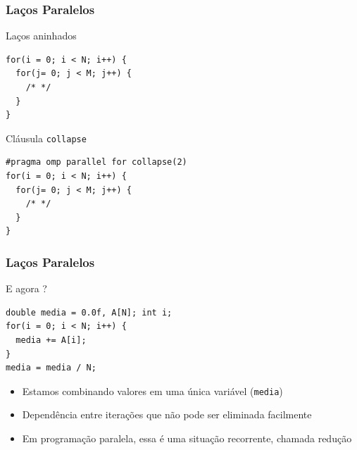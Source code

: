 \documentclass[xcolor={usenames,dvipsnames},12pt,presentation,aspectratio=169]{beamer}
\begin{document}
\begin{frame}[fragile]
  \frametitle{Laços Paralelos}
Laços aninhados
\begin{minipage}{0.95\textwidth}  
\begin{verbatim}
for(i = 0; i < N; i++) {
  for(j= 0; j < M; j++) {
    /* */
  }
}
\end{verbatim}
\end{minipage}
%
\pause
%
Cláusula \texttt{collapse}
\begin{minipage}{0.95\textwidth}  
\begin{verbatim}
#pragma omp parallel for collapse(2)
for(i = 0; i < N; i++) {
  for(j= 0; j < M; j++) {
    /* */
  }
}
\end{verbatim}
\end{minipage}
%
%
\end{frame}
\begin{frame}[fragile]
  \frametitle{Laços Paralelos}
E agora ?
\begin{minipage}{0.95\textwidth}  
\begin{verbatim}
double media = 0.0f, A[N]; int i;
for(i = 0; i < N; i++) {
  media += A[i];
}
media = media / N;
\end{verbatim}
\end{minipage}
%
\pause
%
\begin{itemize}
\item Estamos combinando valores em uma única variável (\texttt{media})
\item Dependência entre iterações que não pode ser eliminada facilmente
\item Em programação paralela, essa é uma situação recorrente, chamada \alert{redução}
\end{itemize}
%
\end{frame}
\end{document}
